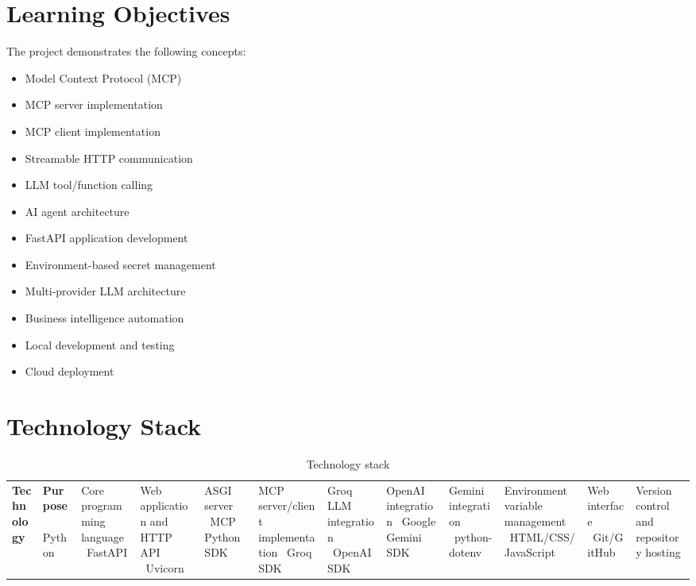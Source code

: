 \documentclass[11pt,a4paper]{article}
\begin{document}
\section{Learning Objectives}

The project demonstrates the following concepts:

\begin{itemize}
\item Model Context Protocol (MCP)
\item MCP server implementation
\item MCP client implementation
\item Streamable HTTP communication
\item LLM tool/function calling
\item AI agent architecture
\item FastAPI application development
\item Environment-based secret management
\item Multi-provider LLM architecture
\item Business intelligence automation
\item Local development and testing
\item Cloud deployment
\end{itemize}

\section{Technology Stack}

\begin{table}[H]
\centering
\begin{tabular}{p{4cm}p{9cm}}
\toprule
\textbf{Technology} & \textbf{Purpose} \
\midrule
Python & Core programming language \
FastAPI & Web application and HTTP API \
Uvicorn & ASGI server \
MCP Python SDK & MCP server/client implementation \
Groq SDK & Groq LLM integration \
OpenAI SDK & OpenAI integration \
Google Gemini SDK & Gemini integration \
python-dotenv & Environment variable management \
HTML/CSS/JavaScript & Web interface \
Git/GitHub & Version control and repository hosting \
\bottomrule
\end{tabular}
\caption{Technology stack}
\end{table}
\end{document}
